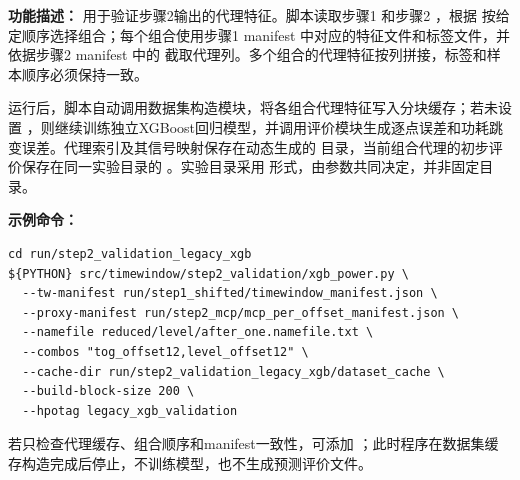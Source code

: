 \textbf{功能描述：} 用于验证步骤2输出的代理特征。脚本读取步骤1  和步骤2 ，根据  按给定顺序选择组合；每个组合使用步骤1 manifest 中对应的特征文件和标签文件，并依据步骤2 manifest 中的  截取代理列。多个组合的代理特征按列拼接，标签和样本顺序必须保持一致。

运行后，脚本自动调用数据集构造模块，将各组合代理特征写入分块缓存；若未设置 ，则继续训练独立XGBoost回归模型，并调用评价模块生成逐点误差和功耗跳变误差。代理索引及其信号映射保存在动态生成的  目录，当前组合代理的初步评价保存在同一实验目录的 。实验目录采用  形式，由参数共同决定，并非固定目录。

\textbf{示例命令：}
\begin{lstlisting}
cd run/step2_validation_legacy_xgb
${PYTHON} src/timewindow/step2_validation/xgb_power.py \
  --tw-manifest run/step1_shifted/timewindow_manifest.json \
  --proxy-manifest run/step2_mcp/mcp_per_offset_manifest.json \
  --namefile reduced/level/after_one.namefile.txt \
  --combos "tog_offset12,level_offset12" \
  --cache-dir run/step2_validation_legacy_xgb/dataset_cache \
  --build-block-size 200 \
  --hpotag legacy_xgb_validation
\end{lstlisting}

若只检查代理缓存、组合顺序和manifest一致性，可添加 ；此时程序在数据集缓存构造完成后停止，不训练模型，也不生成预测评价文件。

